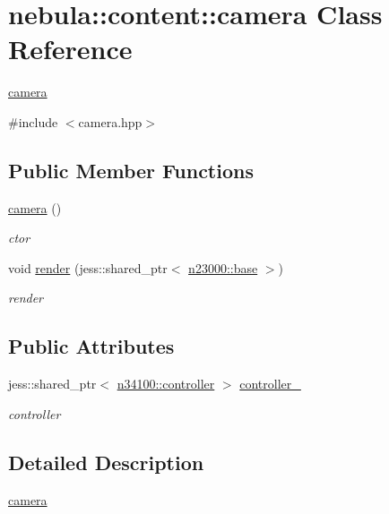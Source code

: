 \hypertarget{classnebula_1_1content_1_1camera}{
\section{nebula::content::camera Class Reference}
\label{classnebula_1_1content_1_1camera}
}


\hyperlink{classnebula_1_1content_1_1camera}{camera}  


{\ttfamily \#include $<$camera.hpp$>$}\subsection*{Public Member Functions}
\begin{DoxyCompactItemize}
\item 
\hyperlink{classnebula_1_1content_1_1camera_a705aba1518297cf1c803fa1ab2a78219}{camera} ()
\begin{DoxyCompactList}\small\item\em ctor \item\end{DoxyCompactList}\item 
void \hyperlink{classnebula_1_1content_1_1camera_a67fd3f3eec8f947473a30f0f326abd29}{render} (jess::shared\_\-ptr$<$ \hyperlink{classnebula_1_1platform_1_1renderer_1_1base}{n23000::base} $>$)
\begin{DoxyCompactList}\small\item\em render \item\end{DoxyCompactList}\end{DoxyCompactItemize}
\subsection*{Public Attributes}
\begin{DoxyCompactItemize}
\item 
jess::shared\_\-ptr$<$ \hyperlink{classnebula_1_1content_1_1actor_1_1admin_1_1controller}{n34100::controller} $>$ \hyperlink{classnebula_1_1content_1_1camera_a66fe5754208de03005b7b06e83f6e6a0}{controller\_\-}
\begin{DoxyCompactList}\small\item\em controller \item\end{DoxyCompactList}\end{DoxyCompactItemize}


\subsection{Detailed Description}
\hyperlink{classnebula_1_1content_1_1camera}{camera} 

